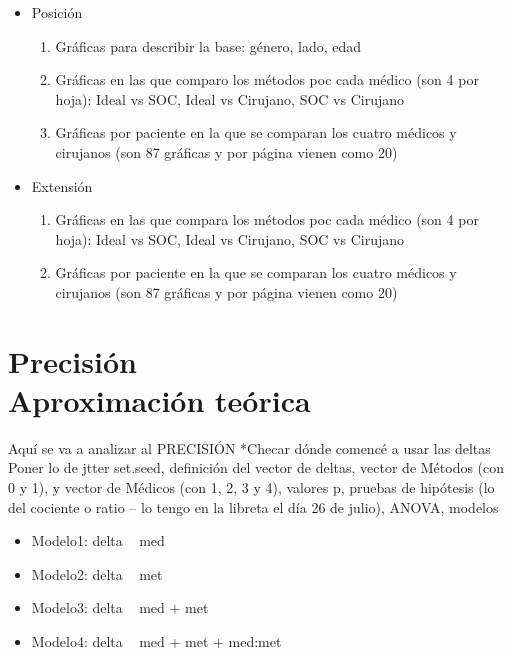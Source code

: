 \documentclass[11pt]{book}
\begin{document}
		
		\begin{itemize}
			\item Posición
				\begin{enumerate}
					\item Gráficas para describir la base: género, lado, edad 
					\item Gráficas en las que comparo los métodos poc cada médico (son 4 por hoja): Ideal vs SOC, Ideal vs Cirujano, SOC vs Cirujano
					\item Gráficas por paciente en la que se comparan los cuatro médicos y cirujanos (son 87 gráficas y por página vienen como 20)
				\end{enumerate}	
			\item Extensión
				\begin{enumerate}
					\item Gráficas en las que compara los métodos poc cada médico (son 4 por hoja): Ideal vs SOC, Ideal vs Cirujano, SOC vs Cirujano
					\item Gráficas por paciente en la que se comparan los cuatro médicos y cirujanos (son 87 gráficas y por página vienen como 20)				
				\end{enumerate}			
		\end{itemize}
	
	
	
	\chapter{Precisión \\Aproximación teórica}  %
	\doublespacing 
	Aquí se va a analizar al PRECISIÓN
	*Checar dónde comencé a usar las deltas
	Poner lo de jtter set.seed, definición del vector de deltas, vector de Métodos (con 0 y 1), y vector de Médicos (con 1, 2, 3 y 4), valores p, pruebas de hipótesis (lo del cociente o ratio -- lo tengo en la libreta el día 26 de julio), ANOVA, modelos
		\begin{itemize}
			\item Modelo1: delta ~ med
			\item Modelo2: delta ~ met
			\item Modelo3: delta ~ med + met
			\item Modelo4: delta ~ med + met + med:met
		\end{itemize}
	
\end{document}
